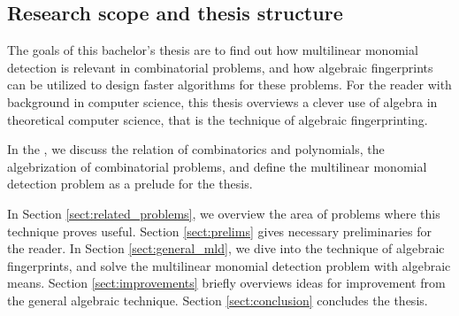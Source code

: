 \subsection{Research scope and thesis structure}

The goals of this bachelor's thesis are 
to find out how multilinear monomial detection is relevant in combinatorial problems, 
and how algebraic fingerprints can be utilized to design faster 
algorithms for these problems. For the reader with background in computer science, 
this thesis overviews a clever use of algebra in theoretical computer science, 
that is the technique of algebraic fingerprinting.

In the , we discuss the relation of combinatorics and 
polynomials,  the algebrization of combinatorial problems, and 
define the multilinear monomial detection problem as a prelude for the thesis. 

In Section \ref{sect:related_problems}, we overview the area of problems where 
this technique proves useful. Section \ref{sect:prelims} gives necessary 
preliminaries for the reader. In Section \ref{sect:general_mld}, we 
dive into the technique of algebraic fingerprints, and solve the 
multilinear monomial detection problem with algebraic means. 
Section \ref{sect:improvements} briefly overviews ideas for 
improvement from the general algebraic technique. 
Section \ref{sect:conclusion} concludes the thesis.



